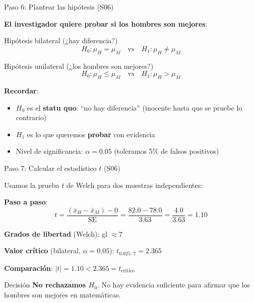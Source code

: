 \documentclass[aspectratio=169, 11pt]{beamer}
\begin{document}
\begin{frame}{Paso 6: Plantear las hipótesis (S06)}
\small

\textbf{El investigador quiere probar si los hombres son mejores}:

\vspace{0.3cm}
\begin{block}{Hipótesis bilateral (¿hay diferencia?)}
\[
H_0: \mu_H = \mu_M \quad \text{vs} \quad H_1: \mu_H \neq \mu_M
\]
\end{block}

\begin{block}{Hipótesis unilateral (¿los hombres son mejores?)}
\[
H_0: \mu_H \leq \mu_M \quad \text{vs} \quad H_1: \mu_H > \mu_M
\]
\end{block}

\vspace{0.2cm}
\textbf{Recordar}:
\begin{itemize}\setlength{\itemsep}{2pt}
  \item $H_0$ es el \textbf{statu quo}: ``no hay diferencia'' (inocente hasta que se pruebe lo contrario)
  \item $H_1$ es lo que queremos \textbf{probar} con evidencia
  \item Nivel de significancia: $\alpha = 0.05$ (toleramos 5\% de falsos positivos)
\end{itemize}
\end{frame}

\begin{frame}{Paso 7: Calcular el estadístico $t$ (S06)}
\small

Usamos la prueba $t$ de Welch para dos muestras independientes:

\vspace{0.2cm}
\textbf{Paso a paso}:
\[
t = \frac{(\bar{x}_H - \bar{x}_M) - 0}{\text{SE}} = \frac{82.0 - 78.0}{3.63} = \frac{4.0}{3.63} = \boxed{1.10}
\]

\textbf{Grados de libertad} (Welch): gl $\approx 7$

\textbf{Valor crítico} (bilateral, $\alpha = 0.05$): $t_{0.025,\,7} = 2.365$

\vspace{0.3cm}
\textbf{Comparación}: $|t| = 1.10 < 2.365 = t_{\text{crítico}}$

\vspace{0.3cm}
\begin{alertblock}{Decisión}
\textbf{No rechazamos $H_0$}. No hay evidencia suficiente para afirmar que los hombres son mejores en matemáticas.
\end{alertblock}
\end{frame}
\end{document}
